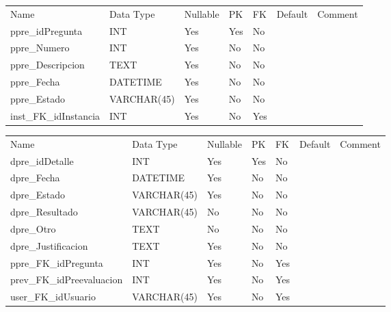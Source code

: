 			\begin{center}
				\begin{tabular}{ |l|l|l|l|l|l|l| }
					\hline
					Name & Data Type & Nullable & PK & FK & Default & Comment \\
					ppre_idPregunta & INT & Yes & Yes & No &  & \\ \hline 
ppre_Numero & INT & Yes & No & No &  & \\ \hline 
ppre_Descripcion & TEXT & Yes & No & No &  & \\ \hline 
ppre_Fecha & DATETIME & Yes & No & No &  & \\ \hline 
ppre_Estado & VARCHAR(45) & Yes & No & No &  & \\ \hline 
inst_FK_idInstancia & INT & Yes & No & Yes &  & \\ \hline 

				\end{tabular}
			\end{center}
		

			\begin{center}
				\begin{tabular}{ |l|l|l|l|l|l|l| }
					\hline
					Name & Data Type & Nullable & PK & FK & Default & Comment \\
					dpre_idDetalle & INT & Yes & Yes & No &  & \\ \hline 
dpre_Fecha & DATETIME & Yes & No & No &  & \\ \hline 
dpre_Estado & VARCHAR(45) & Yes & No & No &  & \\ \hline 
dpre_Resultado & VARCHAR(45) & No & No & No &  & \\ \hline 
dpre_Otro & TEXT & No & No & No &  & \\ \hline 
dpre_Justificacion & TEXT & Yes & No & No &  & \\ \hline 
ppre_FK_idPregunta & INT & Yes & No & Yes &  & \\ \hline 
prev_FK_idPreevaluacion & INT & Yes & No & Yes &  & \\ \hline 
user_FK_idUsuario & VARCHAR(45) & Yes & No & Yes &  & \\ \hline 

				\end{tabular}
			\end{center}
		

